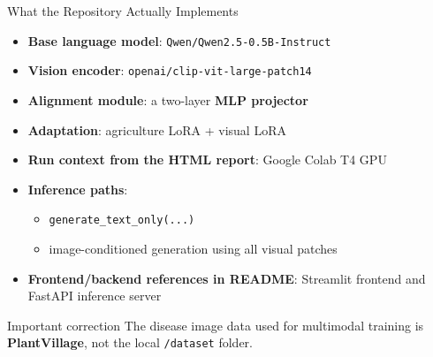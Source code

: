 \documentclass[aspectratio=169,11pt]{beamer}
\begin{document}
\begin{frame}{What the Repository Actually Implements}
\begin{itemize}
    \item \textbf{Base language model}: \texttt{Qwen/Qwen2.5-0.5B-Instruct}
    \item \textbf{Vision encoder}: \texttt{openai/clip-vit-large-patch14}
    \item \textbf{Alignment module}: a two-layer \textbf{MLP projector}
    \item \textbf{Adaptation}: agriculture LoRA + visual LoRA
    \item \textbf{Run context from the HTML report}: Google Colab T4 GPU
    \item \textbf{Inference paths}:
    \begin{itemize}
        \item \texttt{generate\_text\_only(...)}
        \item image-conditioned generation using all visual patches
    \end{itemize}
    \item \textbf{Frontend/backend references in README}: Streamlit frontend and FastAPI inference server
\end{itemize}
\vspace{0.3em}
\begin{alertblock}{Important correction}
The disease image data used for multimodal training is \textbf{PlantVillage}, not the local \texttt{/dataset} folder.
\end{alertblock}
\end{frame}
\end{document}

